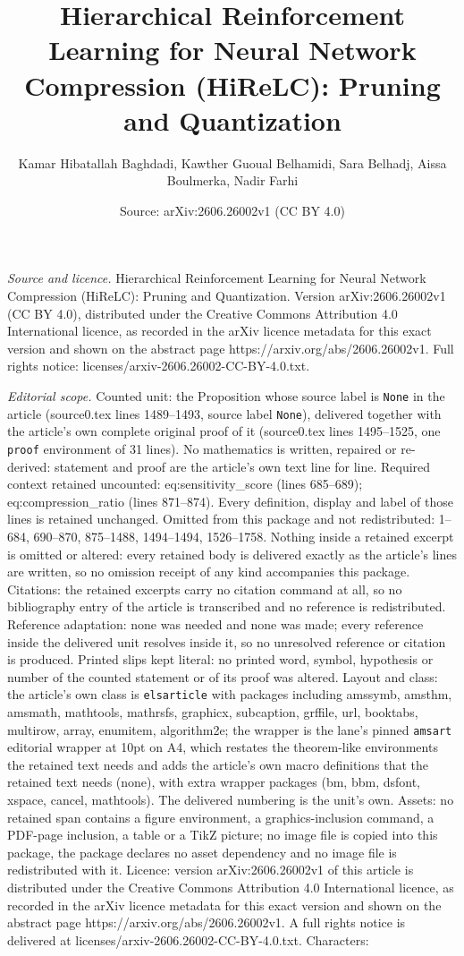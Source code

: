 \documentclass[10pt,a4paper]{amsart}
\title[Hierarchical Reinforcement Learning for Neural Network Compr]{Hierarchical Reinforcement Learning for Neural Network Compression (HiReLC): Pruning and Quantization}
\author{Kamar Hibatallah Baghdadi, Kawther Guoual Belhamidi, Sara Belhadj, Aissa Boulmerka, Nadir Farhi}
\date{Source: arXiv:2606.26002v1 (CC BY 4.0)}
\begin{document}
\maketitle

\noindent\emph{Source and licence.} Hierarchical Reinforcement Learning for Neural Network Compression (HiReLC): Pruning and Quantization. Version arXiv:2606.26002v1 (CC BY 4.0), distributed under the Creative Commons Attribution 4.0 International licence, as recorded in the arXiv licence metadata for this exact version and shown on the abstract page https://arxiv.org/abs/2606.26002v1. Full rights notice: licenses/arxiv-2606.26002-CC-BY-4.0.txt.\par\smallskip

\noindent\textit{Editorial scope.} Counted unit: the Proposition whose source label is \texttt{None} in the article (source0.tex lines 1489--1493, source label \texttt{None}), delivered together with the article's own complete original proof of it (source0.tex lines 1495--1525, one \texttt{proof} environment of 31 lines). No mathematics is written, repaired or re-derived: statement and proof are the article's own text line for line. Required context retained uncounted: eq:sensitivity\_score (lines 685--689); eq:compression\_ratio (lines 871--874). Every definition, display and label of those lines is retained unchanged. Omitted from this package and not redistributed: 1--684, 690--870, 875--1488, 1494--1494, 1526--1758. Nothing inside a retained excerpt is omitted or altered: every retained body is delivered exactly as the article's lines are written, so no omission receipt of any kind accompanies this package. Citations: the retained excerpts carry no citation command at all, so no bibliography entry of the article is transcribed and no reference is redistributed. Reference adaptation: none was needed and none was made; every reference inside the delivered unit resolves inside it, so no unresolved reference or citation is produced. Printed slips kept literal: no printed word, symbol, hypothesis or number of the counted statement or of its proof was altered. Layout and class: the article's own class is \texttt{elsarticle} with packages including amssymb, amsthm, amsmath, mathtools, mathrsfs, graphicx, subcaption, grffile, url, booktabs, multirow, array, enumitem, algorithm2e; the wrapper is the lane's pinned \texttt{amsart} editorial wrapper at 10pt on A4, which restates the theorem-like environments the retained text needs and adds the article's own macro definitions that the retained text needs (none), with extra wrapper packages (bm, bbm, dsfont, xspace, cancel, mathtools). The delivered numbering is the unit's own. Assets: no retained span contains a figure environment, a graphics-inclusion command, a PDF-page inclusion, a table or a TikZ picture; no image file is copied into this package, the package declares no asset dependency and no image file is redistributed with it. Licence: version arXiv:2606.26002v1 of this article is distributed under the Creative Commons Attribution 4.0 International licence, as recorded in the arXiv licence metadata for this exact version and shown on the abstract page https://arxiv.org/abs/2606.26002v1. A full rights notice is delivered at licenses/arxiv-2606.26002-CC-BY-4.0.txt. Characters: 
\end{document}
